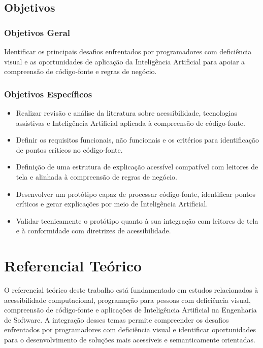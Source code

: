 \documentclass[
    12pt,                   %
    openright,              %
    oneside,                %
    a4paper,                %
    sumario=tradicional,    %
    english,                %
    brazil,                 %
    ]{abntex2}
\begin{document}
\section{Objetivos}\label{sec:objetivos}

\subsection{Objetivos Geral}

Identificar os principais desafios enfrentados por programadores com deficiência visual e as oportunidades de aplicação da Inteligência Artificial para apoiar a compreensão de código-fonte e regras de negócio.

\subsection{Objetivos Específicos}

\begin{itemize} 
  \item Realizar revisão e análise da literatura sobre acessibilidade, tecnologias assistivas e Inteligência Artificial aplicada à compreensão de código-fonte. 
  \item Definir os requisitos funcionais, não funcionais e os critérios para identificação de pontos críticos no código-fonte. 
  \item Definição de uma estrutura de explicação acessível compatível com leitores de tela e alinhada à compreensão de regras de negócio. 
  \item Desenvolver um protótipo capaz de processar código-fonte, identificar pontos críticos e gerar explicações por meio de Inteligência Artificial. 
  \item Validar tecnicamente o protótipo quanto à sua integração com leitores de tela e à conformidade com diretrizes de acessibilidade. 
\end{itemize}


\chapter{Referencial Teórico} 

O referencial teórico deste trabalho está fundamentado em estudos relacionados à acessibilidade computacional, programação para pessoas com deficiência visual, compreensão de código-fonte e aplicações de Inteligência Artificial na Engenharia de Software. A integração desses temas permite compreender os desafios enfrentados por programadores com deficiência visual e identificar oportunidades para o desenvolvimento de soluções mais acessíveis e semanticamente orientadas.
\end{document}
